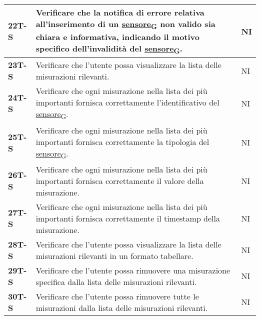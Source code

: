\begin{longtable}{|>{\raggedright\arraybackslash}m{}|>{\raggedright\arraybackslash}m{}|>{\raggedright\arraybackslash}m{}|}
	\hline
	\textbf{22T-S}  & Verificare che la notifica di errore relativa all’inserimento di un \href{https://7last.github.io/docs/rtb/documentazione-interna/glossario\#sensore}{sensore\textsubscript{G}} non valido sia chiara e informativa, indicando il motivo specifico dell’invalidità del \href{https://7last.github.io/docs/rtb/documentazione-interna/glossario\#sensore}{sensore\textsubscript{G}}.        & NI             \\
	\hline
	\textbf{23T-S}  & Verificare che l’utente possa visualizzare la lista delle misurazioni rilevanti.                                                                                                   & NI             \\
	\hline
	\textbf{24T-S}  & Verificare che ogni misurazione nella lista dei più importanti fornisca correttamente l’identificativo del \href{https://7last.github.io/docs/rtb/documentazione-interna/glossario\#sensore}{sensore\textsubscript{G}}.                                                                & NI             \\
	\hline
	\textbf{25T-S}  & Verificare che ogni misurazione nella lista dei più importanti fornisca correttamente la tipologia del \href{https://7last.github.io/docs/rtb/documentazione-interna/glossario\#sensore}{sensore\textsubscript{G}}.                                                                    & NI             \\
	\hline
	\textbf{26T-S}  & Verificare che ogni misurazione nella lista dei più importanti fornisca correttamente il valore della misurazione.                                                                 & NI             \\
	\hline
	\textbf{27T-S}  & Verificare che ogni misurazione nella lista dei più importanti fornisca correttamente il timestamp della misurazione.                                                              & NI             \\
	\hline
	\textbf{28T-S}  & Verificare che l’utente possa visualizzare la lista delle misurazioni rilevanti in un formato tabellare.                                                                           & NI             \\ %
	\hline
	\textbf{29T-S}  & Verificare che l’utente possa rimuovere una misurazione specifica dalla lista delle misurazioni rilevanti.                                                                         & NI             \\
	\hline
	\textbf{30T-S}  & Verificare che l’utente possa rimuovere tutte le misurazioni dalla lista delle misurazioni rilevanti.                                                                              & NI             \\

\end{longtable}
